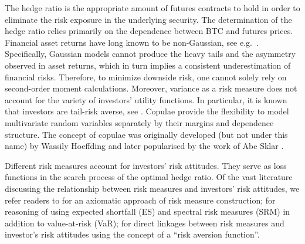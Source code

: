 \documentclass[11pt,a4paper,english]{article}
\providecommand{\natp}[1]{\textcolor{darkorange}{#1}}
\begin{document}
The hedge ratio is the appropriate amount of futures contracts to hold
in order to eliminate the risk exposure in the underlying security.   
The determination of the hedge ratio relies primarily
on the dependence between BTC and futures prices.
Financial asset returns have long known to be non-Gaussian, see e.g.\
\citep{fama1963mandelbrot,Cont2001}. Specifically, Gaussian models
cannot produce the heavy tails and the asymmetry observed in 
asset returns, which in turn implies a consistent underestimation of
financial risks. 
Therefore, to minimize downside risk, one cannot solely rely on
second-order moment calculations. Moreover, variance as a risk measure
does not account for the variety of investors' utility functions. In
particular, it is known that  
investors are tail-risk averse, see \cite{menezes1980increasing}.
Copulae provide the flexibility to model multivariate random variables
separately by their margins and dependence structure.
The concept of copulae was originally developed (but not under this
name) by Wassily Hoeffding \citep{hoeffding1940masstabinvariante}
and later popularised by the work of Abe Sklar \citep{Sklar1959}.

Different risk measures account for investors' risk attitudes.
They serve as loss functions in the search process of the optimal
hedge ratio. Of the vast literature discussing the relationship between
risk measures and investors' risk attitudes, we refer readers to
\citet{artzner1999coherent} for an axiomatic 
approach of risk measure construction;
\citet{embrechts2002correlation} for reasoning of using expected
shortfall (ES) and spectral risk measures (SRM) in addition to
value-at-risk (VaR);
\citet{Acerbi2002} for direct linkages between risk measures and
investor's risk attitudes using the concept of a ``risk aversion
function''. 
\end{document}

